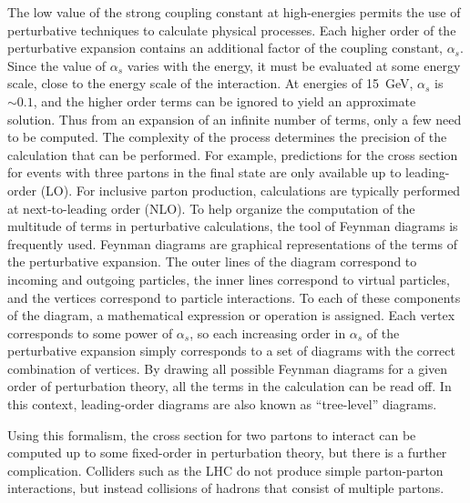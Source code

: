 The low value of the strong coupling constant at high-energies permits the use of perturbative techniques to calculate physical processes. Each higher order of the perturbative expansion contains an additional factor of the coupling constant, $\alpha_s$.  Since the value of $\alpha_s$ varies with the energy, it must be evaluated at some energy scale, close to the energy scale of the interaction. At energies of 15~GeV, $\alpha_s$ is $\sim 0.1$, and the higher order terms can be ignored to yield an approximate solution. Thus from an expansion of an infinite number of terms, only a few need to be computed.
 The complexity of the process determines the precision of the calculation that can be performed.  For example, predictions for the cross section for events with three partons in the final state are only available up to leading-order (LO).  For inclusive parton production, calculations are typically performed at next-to-leading order (NLO).  %
To help organize the computation of the multitude of terms in perturbative calculations, the tool of Feynman diagrams is frequently used. Feynman diagrams are graphical representations of the terms of the perturbative expansion. The outer lines of the diagram correspond to incoming and outgoing particles, the inner lines correspond to virtual particles, and the vertices correspond to particle interactions. To each of these components of the diagram, a mathematical expression or operation is assigned. Each vertex corresponds to some power of $\alpha_s$, so each increasing order in $\alpha_s$ of the perturbative expansion simply corresponds to a set of diagrams with the correct combination of vertices.  By drawing all possible Feynman diagrams for a given order of perturbation theory, all the terms in the calculation can be read off. In this context, leading-order diagrams are also known as ``tree-level'' diagrams. 


Using this formalism, the cross section for two partons to interact can be computed up to some fixed-order in perturbation theory, but there is a further complication. Colliders such as the LHC do not produce simple parton-parton interactions, but instead collisions of hadrons that consist of multiple partons. 

